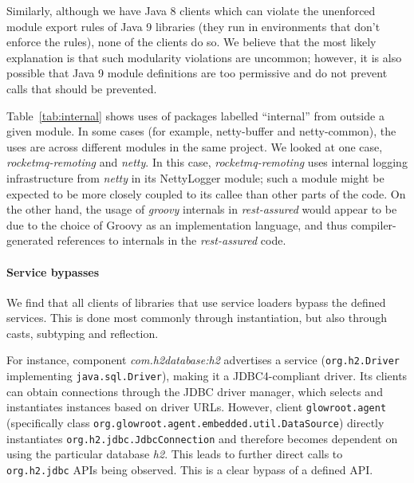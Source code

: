 Similarly, although we have Java 8 clients which can violate the unenforced module export rules of Java 9 libraries (they run in environments that don't enforce the rules), none of the clients do so. We believe that the most likely explanation is that such modularity violations are uncommon; however, it is also possible that Java 9 module definitions are too permissive and do not prevent calls that should be prevented.

Table~\ref{tab:internal} shows uses of packages labelled ``internal'' from outside
a given module. In some cases (for example, netty-buffer and netty-common),
the uses are across different modules in the same project. We looked
at one case, \emph{rocketmq-remoting} and \emph{netty}. In this case,
\emph{rocketmq-remoting} uses internal logging infrastructure from
\emph{netty} in its NettyLogger module; such a module might be
expected to be more closely coupled to its callee than other parts of
the code. On the other hand, the usage of \emph{groovy} internals in
\emph{rest-assured} would appear to be due to the choice of Groovy as
an implementation language, and thus compiler-generated references to
internals in the \emph{rest-assured} code.




\paragraph{Service bypasses}
We find that all clients of libraries that use service loaders bypass the defined services. This is done most commonly through instantiation, but also through casts, subtyping and reflection.

For instance, component \emph{com.h2database:h2} advertises a service (\texttt{org.h2.Driver} implementing \texttt{java.sql.Driver}), making it a JDBC4-compliant driver. Its clients can obtain connections through the JDBC driver manager, which selects and instantiates instances based on driver URLs. However, client \texttt{glowroot.agent} (specifically class \texttt{org.glowroot.\-agent.embedded.util.DataSource}) directly instantiates \texttt{org.h2.jdbc.JdbcConnection} and therefore becomes dependent on using the particular database \emph{h2}. This leads to further direct calls to \texttt{org.h2.jdbc} APIs being observed. This is a clear bypass of a defined API. 

